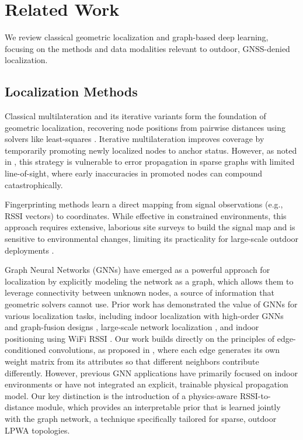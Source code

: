 \documentclass{ieeeaccess}
\begin{document}
\section{Related Work}
We review classical geometric localization and graph-based deep learning, focusing on the methods and data modalities relevant to outdoor, GNSS-denied localization.

\subsection{Localization Methods}
Classical multilateration and its iterative variants form the foundation of geometric localization, recovering node positions from pairwise distances using solvers like least-squares \cite{r2,r3}. Iterative multilateration improves coverage by temporarily promoting newly localized nodes to anchor status. However, as noted in \cite{r4}, this strategy is vulnerable to error propagation in sparse graphs with limited line-of-sight, where early inaccuracies in promoted nodes can compound catastrophically. 

Fingerprinting methods learn a direct mapping from signal observations (e.g., RSSI vectors) to coordinates. While effective in constrained environments, this approach requires extensive, laborious site surveys to build the signal map and is sensitive to environmental changes, limiting its practicality for large-scale outdoor deployments \cite{r5,r6}.

Graph Neural Networks (GNNs) have emerged as a powerful approach for localization by explicitly modeling the network as a graph, which allows them to leverage connectivity between unknown nodes, a source of information that geometric solvers cannot use. Prior work has demonstrated the value of GNNs for various localization tasks, including indoor localization with high-order GNNs \cite{r7} and graph-fusion designs \cite{r8}, large-scale network localization \cite{r9}, and indoor positioning using WiFi RSSI \cite{r10}. Our work builds directly on the principles of edge-conditioned convolutions, as proposed in \cite{r11}, where each edge generates its own weight matrix from its attributes so that different neighbors contribute differently. However, previous GNN applications have primarily focused on indoor environments or have not integrated an explicit, trainable physical propagation model. Our key distinction is the introduction of a physics-aware RSSI-to-distance module, which provides an interpretable prior that is learned jointly with the graph network, a technique specifically tailored for sparse, outdoor LPWA topologies.
\end{document}
